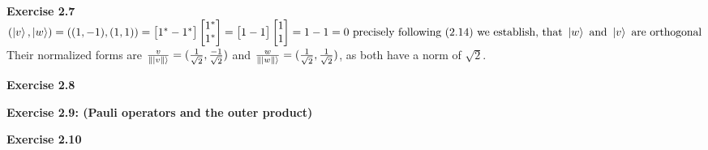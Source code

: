\documentclass{article}
\begin{document}
\bigskip

\begin{framed}
    \noindent \textbf{Exercise 2.7}
    \medskip
    $(\ket{v}, \ket{w}) =  ((1, -1), (1, 1)) = \begin{bmatrix} 1^* -1^* \end{bmatrix} \begin{bmatrix} 1^* \\ 1^* \end{bmatrix} = \begin{bmatrix} 1 -1 \end{bmatrix} \begin{bmatrix} 1 \\ 1 \end{bmatrix} = 1 - 1 = 0 \text{ precisely following (2.14) we establish, that }\ket{w} \text{ and } \ket{v} \text{ are orthogonal}$
    Their normalized forms are $\frac{v}{\| \ket{v \|}} = (\frac{1}{\sqrt{2}}, \frac{-1}{\sqrt{2}})$ and $\frac{w}{\| \ket{w \|}} = (\frac{1}{\sqrt{2}}, \frac{1}{\sqrt{2}})$, as both have a norm of $\sqrt{2}$.
    
\end{framed}

\bigskip

\begin{framed}
    \noindent \textbf{Exercise 2.8}
    
    \medskip
    
    
\end{framed}

\bigskip

\begin{framed}
    \noindent \textbf{Exercise 2.9: (Pauli operators and the outer product)}
    
    \medskip
    
    
\end{framed}

\bigskip

\begin{framed}
    \noindent \textbf{Exercise 2.10}
    
    \medskip
    
    
\end{framed}

\bigskip
\end{document}
